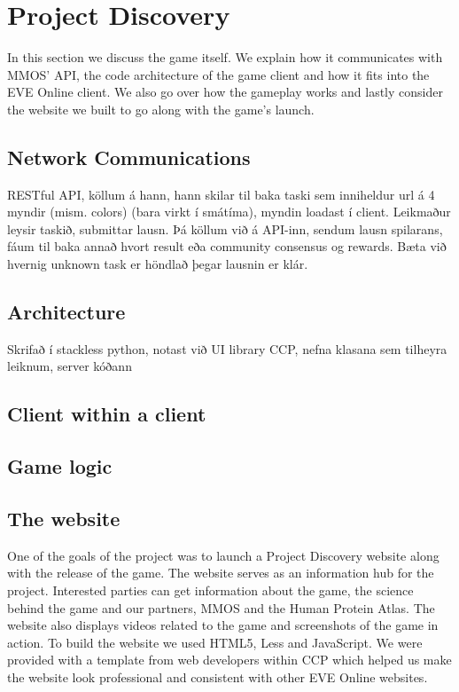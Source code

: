 \section{Project Discovery}\label{sec:projectdiscovery}

In this section we discuss the game itself. We explain how it communicates with MMOS' API, the code architecture of the game client and how it fits into the EVE Online client. We also go over how the gameplay works and lastly consider the website we built to go along with the game's launch.

\subsection{Network Communications}

RESTful API, köllum á hann, hann skilar til baka taski sem inniheldur url á 4 myndir (mism. colors) (bara virkt í smátíma), myndin loadast í client. Leikmaður leysir taskið, submittar lausn. Þá köllum við á API-inn, sendum lausn spilarans, fáum til baka annað hvort result eða community consensus og rewards. Bæta við hvernig unknown task er höndlað þegar lausnin er klár.

\subsection{Architecture}

Skrifað í stackless python, notast við UI library CCP, nefna klasana sem tilheyra leiknum, server kóðann

\subsection{Client within a client}

\subsection{Game logic}

\subsection{The website}
One of the goals of the project was to launch a Project Discovery website along with the release of the game. The website serves as an information hub for the project. Interested parties can get information about the game, the science behind the game and our partners, MMOS and the Human Protein Atlas. The website also displays videos related to the game and screenshots of the game in action. To build the website we used HTML5, Less and JavaScript. We were provided with a template from web developers within CCP which helped us make the website look professional and consistent with other EVE Online websites.
